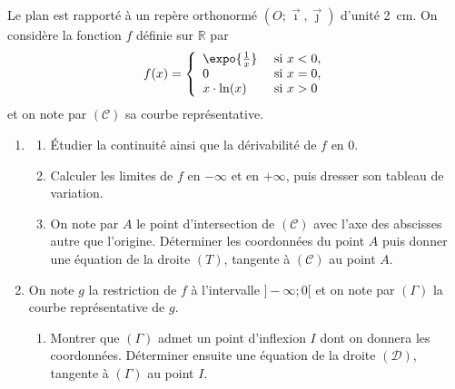       \begin{exo}
      \label{exo:el raccord exp ln}
            Le plan est rapport\'e \`a un rep\`ere orthonorm\'e $(O ; \vec{\imath} , \vec{\jmath})$
            d'unit\'e 2~cm.
            On consid\`ere la fonction $f$ d\'efinie sur $\mathbb{R}$ par
            \[
                  f(x) =
                  \left\lbrace
                        \begin{array}{l  l}
                              \expo{\frac{1}{x}} & \text{ si } x < 0,      \\
                              0                  & \text{ si } x = 0,      \\
                              x \cdot \ln (x)    & \text{ si } x > 0
                        \end{array}
                  \right.
            \]
            et on note par $(\mathscr{C})$ sa courbe repr\'esentative.
            \begin{enumerate}
                  \item
                  \begin{enumerate}
                        \item \'Etudier la continuit\'e ainsi que la d\'erivabilit\'e de $f$ en $0$.
                        \item Calculer les limites de $f$ en $-\infty$ et en $+\infty$,
                              puis dresser son tableau de variation.
                        \item On note par $A$ le point d'intersection de $(\mathscr{C})$ avec l'axe des abscisses
                              autre que l'origine.
                              D\'eterminer les coordonn\'ees du point $A$ puis donner une \'equation
                              de la droite $(T)$, tangente \`a $(\mathscr{C})$ au point $A$.
                  \end{enumerate}
                  \item On note $g$ la restriction de $f$ \`a l'intervalle $]-\infty ; 0[$
                        et on note par $(\Gamma)$ la courbe repr\'esentative de $g$.
                  \begin{enumerate}
                        \item Montrer que $(\Gamma)$ admet un point d'inflexion $I$ dont on donnera les coordonn\'ees.
                              D\'eterminer ensuite une \'equation de la droite $(\mathscr{D})$,
                              tangente \`a $(\Gamma)$ au point $I$.

\end{enumerate}
\end{enumerate}
\end{exo}
